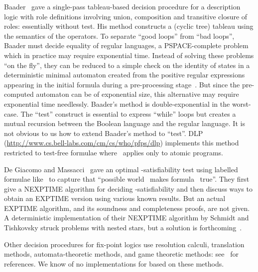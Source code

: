 \documentclass{entcs}
\newcommand{\pdl}{}
\begin{document}
Baader~\cite{baader-augmenting-transitive-closure}
gave a single-pass tableau-based decision procedure for a description logic
with role definitions involving union, composition and transitive closure of roles:
essentially \pdl{} without test.
His method constructs a (cyclic tree) tableau
using the semantics of the \pdl{} operators.
To separate ``good loops'' from ``bad loops'',
Baader must decide equality of regular languages,
a PSPACE-complete problem
which in practice may require exponential time.
Instead of solving these problems ``on the fly'',
they can be reduced to a simple check on the identity of states
in a deterministic minimal automaton
created from the positive regular expressions
appearing in the initial formula
during a pre-processing stage~\cite[page~27]{baader-augmenting-transitive-closure}.
But since the pre-computed automaton can be of exponential size,
this alternative may require exponential time needlessly. 
Baader's method is double-exponential in the worst-case.
The ``test'' construct is essential to express ``while'' loops
but creates a mutual recursion between the Boolean language
and the regular language.
It is not obvious to us how to extend Baader's method to ``test''.
DLP (\url{http://www.cs.bell-labs.com/cm/cs/who/pfps/dlp})
implements this method restricted to test-free formulae
where~ applies only to atomic programs.

De Giacomo and Massacci~\cite{de-giacomo-massacci-tableaux-converse-pdl}
gave an optimal \pdl{}-satisfiability test
using labelled formulae like~ to capture
that ``possible world~ makes formula~ true''.
They first give a NEXPTIME algorithm for deciding \pdl{}-satisfiability 
and then discuss ways to obtain an EXPTIME version using various known results.
But an actual EXPTIME algorithm,
and its soundness and completeness proofs,
are not given.
A deterministic implementation of their NEXPTIME algorithm by Schmidt and Tishkovsky
struck problems with nested stars,
but a solution is forthcoming~\cite{schmidt-tishkovsky-pdl-tableau}.

Other decision procedures for fix-point logics use resolution calculi,
translation methods, automata-theoretic methods, and game theoretic methods:
see~\cite{abate-gore-widmann-onepass-ctl-lpar} for references.
We know of no implementations for \pdl{} based on these methods.
\end{document}
